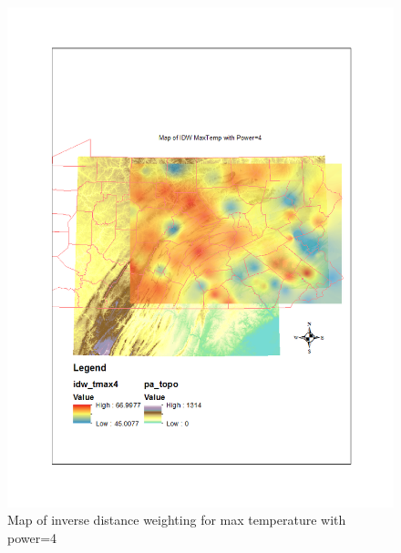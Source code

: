 \documentclass{article}\usepackage[]{graphicx}\usepackage[]{color}
\begin{document}
\begin{figure}
\includegraphics[scale=.9]{./figure/IDWmax4}
\caption{Map of inverse distance weighting for max temperature with power=4}
\label{idwmax4}
\end{figure}
\end{document}
